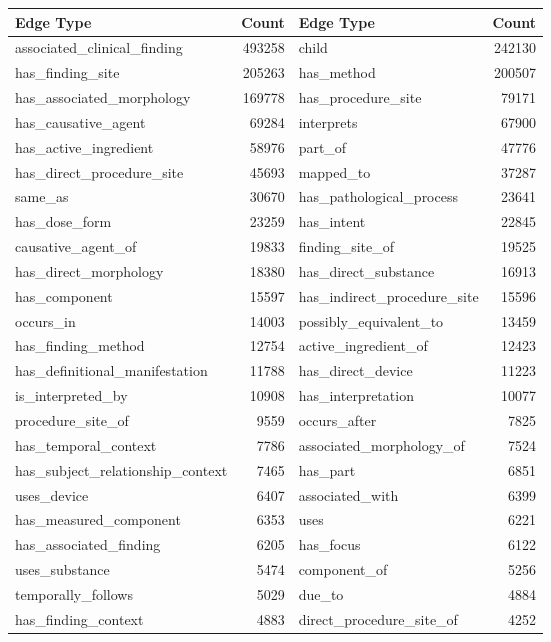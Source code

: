 \documentclass[11pt, a4paper]{article}
\begin{document}
\begin{table}[ht]
	{\footnotesize
    \centering
    \begin{adjustbox}{center}
    \begin{tabular}{lr | lr}
        \toprule
        \bf{Edge Type} & \bf{Count} & \bf{Edge Type} & \bf{Count} \\%
        \midrule
associated\_clinical\_finding&493258&child&242130\\
has\_finding\_site&205263&has\_method&200507\\
has\_associated\_morphology&169778&has\_procedure\_site&79171\\
has\_causative\_agent&69284&interprets&67900\\
has\_active\_ingredient&58976&part\_of&47776\\
has\_direct\_procedure\_site&45693&mapped\_to&37287\\
same\_as&30670&has\_pathological\_process&23641\\
has\_dose\_form&23259&has\_intent&22845\\
causative\_agent\_of&19833&finding\_site\_of&19525\\
has\_direct\_morphology&18380&has\_direct\_substance&16913\\
has\_component&15597&has\_indirect\_procedure\_site&15596\\
occurs\_in&14003&possibly\_equivalent\_to&13459\\
has\_finding\_method&12754&active\_ingredient\_of&12423\\
has\_definitional\_manifestation&11788&has\_direct\_device&11223\\
is\_interpreted\_by&10908&has\_interpretation&10077\\
procedure\_site\_of&9559&occurs\_after&7825\\
has\_temporal\_context&7786&associated\_morphology\_of&7524\\
has\_subject\_relationship\_context&7465&has\_part&6851\\
uses\_device&6407&associated\_with&6399\\
has\_measured\_component&6353&uses&6221\\
has\_associated\_finding&6205&has\_focus&6122\\
uses\_substance&5474&component\_of&5256\\
temporally\_follows&5029&due\_to&4884\\
has\_finding\_context&4883&direct\_procedure\_site\_of&4252\\

\end{tabular}
\end{adjustbox}}
\end{table}
\end{document}

